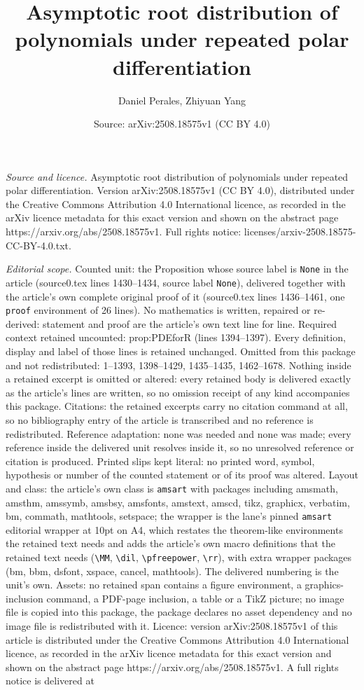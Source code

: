 \documentclass[10pt,a4paper]{amsart}
\title[Asymptotic root distribution of polynomials under repeated p]{Asymptotic root distribution of polynomials under repeated polar differentiation}
\author{Daniel Perales, Zhiyuan Yang}
\date{Source: arXiv:2508.18575v1 (CC BY 4.0)}
\begin{document}
\maketitle

\noindent\emph{Source and licence.} Asymptotic root distribution of polynomials under repeated polar differentiation. Version arXiv:2508.18575v1 (CC BY 4.0), distributed under the Creative Commons Attribution 4.0 International licence, as recorded in the arXiv licence metadata for this exact version and shown on the abstract page https://arxiv.org/abs/2508.18575v1. Full rights notice: licenses/arxiv-2508.18575-CC-BY-4.0.txt.\par\smallskip

\noindent\textit{Editorial scope.} Counted unit: the Proposition whose source label is \texttt{None} in the article (source0.tex lines 1430--1434, source label \texttt{None}), delivered together with the article's own complete original proof of it (source0.tex lines 1436--1461, one \texttt{proof} environment of 26 lines). No mathematics is written, repaired or re-derived: statement and proof are the article's own text line for line. Required context retained uncounted: prop:PDEforR (lines 1394--1397). Every definition, display and label of those lines is retained unchanged. Omitted from this package and not redistributed: 1--1393, 1398--1429, 1435--1435, 1462--1678. Nothing inside a retained excerpt is omitted or altered: every retained body is delivered exactly as the article's lines are written, so no omission receipt of any kind accompanies this package. Citations: the retained excerpts carry no citation command at all, so no bibliography entry of the article is transcribed and no reference is redistributed. Reference adaptation: none was needed and none was made; every reference inside the delivered unit resolves inside it, so no unresolved reference or citation is produced. Printed slips kept literal: no printed word, symbol, hypothesis or number of the counted statement or of its proof was altered. Layout and class: the article's own class is \texttt{amsart} with packages including amsmath, amsthm, amssymb, amsbsy, amsfonts, amstext, amscd, tikz, graphicx, verbatim, bm, commath, mathtools, setspace; the wrapper is the lane's pinned \texttt{amsart} editorial wrapper at 10pt on A4, which restates the theorem-like environments the retained text needs and adds the article's own macro definitions that the retained text needs (\texttt{\textbackslash MM}, \texttt{\textbackslash dil}, \texttt{\textbackslash pfreepower}, \texttt{\textbackslash rr}), with extra wrapper packages (bm, bbm, dsfont, xspace, cancel, mathtools). The delivered numbering is the unit's own. Assets: no retained span contains a figure environment, a graphics-inclusion command, a PDF-page inclusion, a table or a TikZ picture; no image file is copied into this package, the package declares no asset dependency and no image file is redistributed with it. Licence: version arXiv:2508.18575v1 of this article is distributed under the Creative Commons Attribution 4.0 International licence, as recorded in the arXiv licence metadata for this exact version and shown on the abstract page https://arxiv.org/abs/2508.18575v1. A full rights notice is delivered at 
\end{document}
